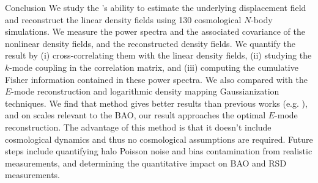 \begin{section}{Conclusion}
  \label{sec:conclusion}
  We study the 's ability to estimate the underlying displacement 
  field and reconstruct the linear density fields using 130 cosmological $N$-body 
  simulations.  We measure the power spectra and the associated covariance of the 
  nonlinear density fields, and the reconstructed density fields.  We quantify the 
  result by (i) cross-correlating them with the linear density fields, (ii) studying 
  the $k$-mode coupling in the correlation matrix, and (iii) computing the cumulative 
  Fisher information contained in these power spectra.  We also
  compared with the $E$-mode 
  reconstruction and logarithmic density mapping Gaussianization
  techniques.
  We find that  method gives better results than previous works
  (e.g. \citealt{bib:Mark2009,bib:Zhang2011,bib:HarnoisD2013}), and on scales 
  relevant to the BAO, our result approaches the optimal $E$-mode reconstruction.  
  The advantage of this method is that it doesn't include cosmological dynamics and thus 
  no cosmological assumptions are required.
  Future steps include quantifying halo Poisson noise and bias contamination 
  from realistic measurements, and determining the quantitative impact on
  BAO and RSD measurements.  

\end{section}

